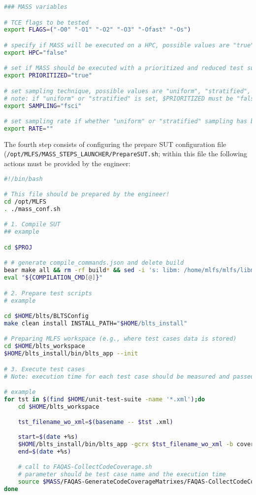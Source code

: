 \begin{lstlisting}[language=bash]
### MASS variables

# TCE flags to be tested 
export FLAGS=("-O0" "-O1" "-O2" "-O3" "-Ofast" "-Os")

# specify if MASS will be executed on a HPC, possible values are "true" or "false"
export HPC="false"

# set if MASS should be executed with a prioritized and reduced test suite
export PRIORITIZED="true"

# set sampling technique, possible values are "uniform", "stratified", and "fsci"
# note: if "uniform" or "stratified" is set, $PRIORITIZED must be "false"
export SAMPLING="fsci"

# set sampling rate if whether "uniform" or "stratified" sampling has been selected
export RATE=""
\end{lstlisting}

The fourth step consists of configuring the prepare SUT configuration file \\(\texttt{/opt/MLFS/MASS\_STEPS\_LAUNCHER/PrepareSUT.sh}; within this file the following actions must be provided by the engineer:


\begin{lstlisting}[language=bash]
#!/bin/bash

# This file should be prepared by the engineer!                                                                                           
cd /opt/MLFS
. ./mass_conf.sh

# 1. Compile SUT
## example

cd $PROJ

# # generate compile_commands.json and delete build
bear make all && rm -rf build* && sed -i 's: libm: /home/mlfs/mlfs/libm:' compile_commands.json && mv compile_commands.json $MUTANTS_DIR
eval "${COMPILATION_CMD[@]}"

# 2. Prepare test scripts
# example

cd $HOME/blts/BLTSConfig
make clean install INSTALL_PATH="$HOME/blts_install"

# Preparing MLFS workspace (e.g., where test cases data is stored)
cd $HOME/blts_workspace
$HOME/blts_install/bin/blts_app --init

# 3. Execute test cases
# Note: execution time for each test case should be measured and passed as argument to FAQAS-CollectCodeCoverage.sh

# example
for tst in $(find $HOME/unit-test-suite -name '*.xml');do
    cd $HOME/blts_workspace

    tst_filename_wo_xml=$(basename -- $tst .xml)
    
    start=$(date +%s)
    $HOME/blts_install/bin/blts_app -gcrx $tst_filename_wo_xml -b coverage --nocsv -s $tst
    end=$(date +%s)    

    # call to FAQAS-CollectCodeCoverage.sh
    # parameter should be test case name and the execution time
    source $MASS/FAQAS-GenerateCodeCoverageMatrixes/FAQAS-CollectCodeCoverage.sh $tst_filename_wo_xml "$(($end-$start))" $PROJ_COV
done
\end{lstlisting}

